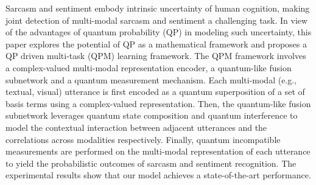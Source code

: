 Sarcasm and sentiment embody intrinsic uncertainty of human cognition, making joint detection of multi-modal sarcasm and sentiment a challenging task. In view of the advantages of quantum probability (QP) in modeling such uncertainty, this paper explores the potential of QP as a mathematical framework and proposes a QP driven multi-task (QPM) learning framework. The QPM framework involves a complex-valued multi-modal representation encoder, a quantum-like fusion subnetwork and a quantum measurement mechanism. Each multi-modal (e.g., textual, visual) utterance is first encoded as a quantum superposition of a set of basis terms using a complex-valued representation. Then, the quantum-like fusion subnetwork leverages quantum state composition and quantum interference to model the contextual interaction between adjacent utterances and the correlations across modalities respectively. Finally, quantum incompatible measurements are performed on the multi-modal representation of each utterance to yield the probabilistic outcomes of sarcasm and sentiment recognition. The experimental results show that our model achieves a state-of-the-art performance.
